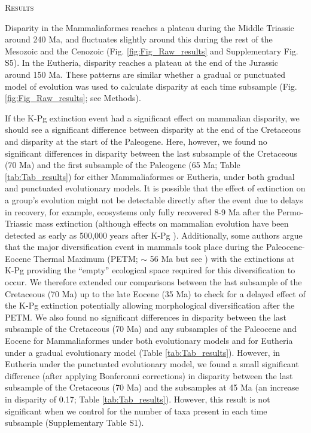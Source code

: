 \documentclass[12pt,letterpaper]{article}
\renewcommand{\section}[1]{%
\bigskip
\begin{center}
\begin{Large}
\normalfont\scshape #1
\medskip
\end{Large}
\end{center}}
\begin{document}
%
%

\section{Results}
Disparity in the Mammaliaformes reaches a plateau during the Middle Triassic around 240 Ma, and fluctuates slightly around this during the rest of the Mesozoic and the Cenozoic (Fig. \ref{fig:Fig_Raw_results} and Supplementary Fig. S5).
In the Eutheria, disparity reaches a plateau at the end of the Jurassic around 150 Ma.
These patterns are similar whether a gradual or punctuated model of evolution was used to calculate disparity at each time subsample (Fig. \ref{fig:Fig_Raw_results}; see Methods).

If the K-Pg extinction event had a significant effect on mammalian disparity, we should see a significant difference between disparity at the end of the Cretaceous and disparity at the start of the Paleogene.
Here, however, we found no significant differences in disparity between the last subsample of the Cretaceous (70 Ma) and the first subsample of the Paleogene (65 Ma; Table \ref{tab:Tab_results}) for either Mammaliaformes or Eutheria, under both gradual and punctuated evolutionary models. 
It is possible that the effect of extinction on a group's evolution might not be detectable directly after the event due to delays in recovery, for example, ecosystems only fully recovered 8-9 Ma after the Permo-Triassic mass extinction \cite{chen2012timing} (although effects on mammalian evolution have been detected as early as 500,000 years after K-Pg \cite{Wilson2013}).
Additionally, some authors argue that the major diversification event in mammals took place during the Paleocene-Eocene Thermal Maximum (PETM; $\sim$ 56 Ma \cite{bininda2007delayed} but see \cite{meredithimpacts2011,Stadler12042011}) with the extinctions at K-Pg providing the ``empty'' ecological space required for this diversification to occur.
We therefore extended our comparisons between the last subsample of the Cretaceous (70 Ma) up to the late Eocene (35 Ma) to check for a delayed effect of the K-Pg extinction potentially allowing morphological diversification after the PETM. 
We also found no significant differences in disparity between the last subsample of the Cretaceous (70 Ma) and any subsamples of the Paleocene and Eocene for Mammaliaformes under both evolutionary models and for Eutheria under a gradual evolutionary model (Table \ref{tab:Tab_results}).
However, in Eutheria under the punctuated evolutionary model, we found a small significant difference (after applying Bonferonni corrections) in disparity between the last subsample of the Cretaceous (70 Ma) and the subsamples at 45 Ma (an increase in disparity of 0.17; Table \ref{tab:Tab_results}).
However, this result is not significant when we control for the number of taxa present in each time subsample (Supplementary Table S1). 
\end{document}
